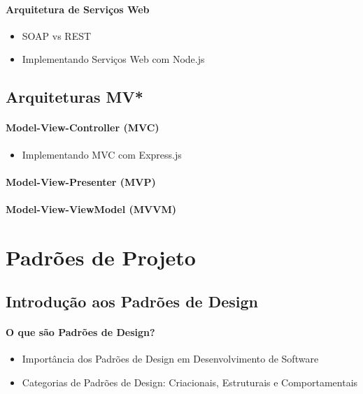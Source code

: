 \subsubsection{Arquitetura de Serviços Web}
\begin{itemize}
\item SOAP vs REST
\item Implementando Serviços Web com Node.js
\end{itemize}


\section{Arquiteturas MV*}

\subsubsection{Model-View-Controller (MVC)}
\begin{itemize}
\item Implementando MVC com Express.js
\end{itemize}
\subsubsection{Model-View-Presenter (MVP)}
\subsubsection{Model-View-ViewModel (MVVM)}













\chapter{Padrões de Projeto}
\section{Introdução aos Padrões de Design}
\subsubsection{O que são Padrões de Design?}
\begin{itemize}
\item Importância dos Padrões de Design em Desenvolvimento de Software
\item Categorias de Padrões de Design: Criacionais, Estruturais e Comportamentais
\end{itemize}

